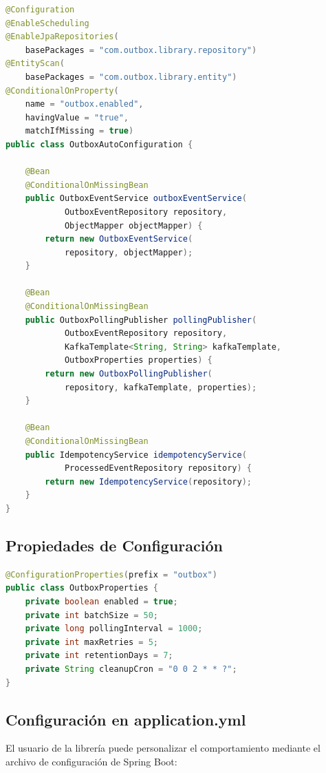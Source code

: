 \begin{lstlisting}[language=Java, caption={Auto-configuración de la librería.}]
@Configuration
@EnableScheduling
@EnableJpaRepositories(
    basePackages = "com.outbox.library.repository")
@EntityScan(
    basePackages = "com.outbox.library.entity")
@ConditionalOnProperty(
    name = "outbox.enabled",
    havingValue = "true",
    matchIfMissing = true)
public class OutboxAutoConfiguration {

    @Bean
    @ConditionalOnMissingBean
    public OutboxEventService outboxEventService(
            OutboxEventRepository repository,
            ObjectMapper objectMapper) {
        return new OutboxEventService(
            repository, objectMapper);
    }

    @Bean
    @ConditionalOnMissingBean
    public OutboxPollingPublisher pollingPublisher(
            OutboxEventRepository repository,
            KafkaTemplate<String, String> kafkaTemplate,
            OutboxProperties properties) {
        return new OutboxPollingPublisher(
            repository, kafkaTemplate, properties);
    }

    @Bean
    @ConditionalOnMissingBean
    public IdempotencyService idempotencyService(
            ProcessedEventRepository repository) {
        return new IdempotencyService(repository);
    }
}
\end{lstlisting}

\subsection{Propiedades de Configuración}

\begin{lstlisting}[language=Java, caption={Propiedades configurables de la librería.}]
@ConfigurationProperties(prefix = "outbox")
public class OutboxProperties {
    private boolean enabled = true;
    private int batchSize = 50;
    private long pollingInterval = 1000;
    private int maxRetries = 5;
    private int retentionDays = 7;
    private String cleanupCron = "0 0 2 * * ?";
}
\end{lstlisting}

\subsection{Configuración en application.yml}

El usuario de la librería puede personalizar el comportamiento mediante el archivo de configuración de Spring Boot:

